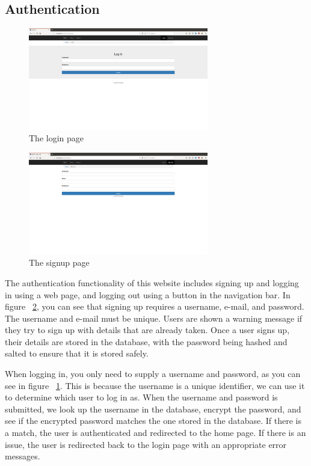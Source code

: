 \subsection{Authentication}

\begin{figure}[htb]
	\centering
	\includegraphics[width=0.7\textwidth]{final_report/pics/login.png}
	\caption{The login page}
	\label{fig:wireLogin}
\end{figure}

\begin{figure}[htb]
	\centering
	\includegraphics[width=0.7\textwidth]{final_report/pics/signup.png}
	\caption{The signup page}
	\label{fig:wireSignup}
\end{figure}

The authentication functionality of this website includes signing up and
logging in using a web page, and logging out using a button in the navigation
bar. In figure ~\ref{fig:wireSignup}, you can see that signing up requires
a username, e-mail, and password. The username and e-mail must be unique.
Users are shown a warning message if they try to sign up with details that
are already taken. Once a user signs up, their details are stored in the
database, with the password being hashed and salted to ensure that it is
stored safely.

When logging in, you only need to supply a username and password, as you can
see in figure ~\ref{fig:wireLogin}. This is because the username is a unique
identifier, we can use it to determine which user to log in as. When the username
and password is submitted, we look up the username in the database, encrypt the
password, and see if the encrypted password matches the one stored in the database. 
If there is a match, the user is authenticated and redirected to the home page. 
If there is an issue, the user is redirected back to the login page with an 
appropriate error messages.

